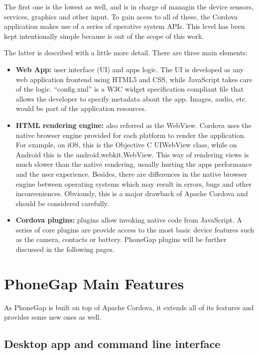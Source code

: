 The first one is the lowest as well, and is in charge of managin the device sensors, services, graphics and other input. To gain acces to all of these, the Cordova application makes use of a series of operative system APIs. This level has been kept intentionally simple because is out of the scope of this work.

The latter is described with a little more detail. There are three main elements: 

\begin{itemize} 
 \item \textbf{Web App:} user interface (UI) and apps logic. The UI is developed as any web application frontend using HTML5 and CSS, while JavaScript takes care of the logic. ``config.xml'' is a W3C widget specification compliant file that allows the developer to specify metadata about the app. Images, audio, etc. would be part of the application resources.
 \item \textbf{HTML rendering engine:} also referred as the WebView. Cordova uses the native browser engine provided for each platform to render the application. For example, on iOS, this is the Objective C UIWebView class, while on Android this is the android.webkit.WebView. This way of rendering views is much slower than the native rendering, usually hurting the apps performance and the user experience. Besides, there are differences in the native browser engine between operating systems which may result in errors, bugs and other inconveniences. Obviously, this is a major drawback of Apache Cordova and should be considered carefully. 
 \item \textbf{Cordova plugins:} plugins allow invoking native code from JavaScript. A series of core plugins are provide access to the most basic device features such as the camera, contacts or battery. PhoneGap plugins will be further discussed in the following pages.
\end{itemize}

\section{PhoneGap Main Features}

As PhoneGap is built on top of Apache Cordova, it extends all of its features and provides some new ones as well.

\subsection{Desktop app and command line interface}


